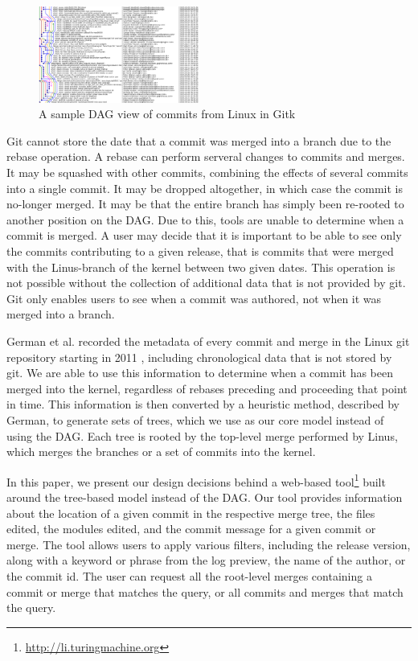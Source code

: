 \documentclass[conference, draftclsnofoot]{IEEEtran}
\begin{document}
\begin{figure}
        \centering
        \includegraphics[width=0.47\textwidth]{figures/gitk.png}
        \caption{A sample DAG view of commits from Linux in Gitk}
        \label{fig:gitk}
\end{figure}

Git cannot store the date that a commit was merged into a branch due to the rebase
operation. A rebase can perform serveral changes to commits and merges. It may be
squashed with other commits, combining the effects of several commits into a single
commit. It may be dropped altogether, in which case the commit is no-longer merged.
It may be that the entire branch has simply been re-rooted to another position on
the DAG. Due to this, tools are unable to determine when a commit is merged. A user
may decide that it is important to be able to see only the commits contributing to a
given release, that is commits that were merged with the Linus-branch of the kernel
between two given dates. This operation is not possible without the collection of
additional data that is not provided by git. Git only enables users to see when a
commit was authored, not when it was merged into a branch.

German et al. recorded the metadata of every commit and merge in the Linux git
repository starting in 2011 \cite{German2015}, including chronological data that is
not stored by git. We are able to use this information to determine when a commit
has been merged into the kernel, regardless of rebases preceding and proceeding that
point in time. This information is then converted by a heuristic method, described
by German, to generate sets of trees, which we use as our core model instead of
using the DAG. Each tree is rooted by the top-level merge performed by Linus, which
merges the branches or a set of commits into the kernel.

In this paper, we present our design decisions behind a web-based
tool\footnote{\url{http://li.turingmachine.org}} built around the tree-based model
instead of the DAG. Our tool provides information about the location of a given
commit in the respective merge tree, the files edited, the modules edited, and the
commit message for a given commit or merge. The tool allows users to apply various
filters, including the release version, along with a keyword or phrase from the log
preview, the name of the author, or the commit id. The user can request all the
root-level merges containing a commit or merge that matches the query, or all
commits and merges that match the query.
\end{document}
